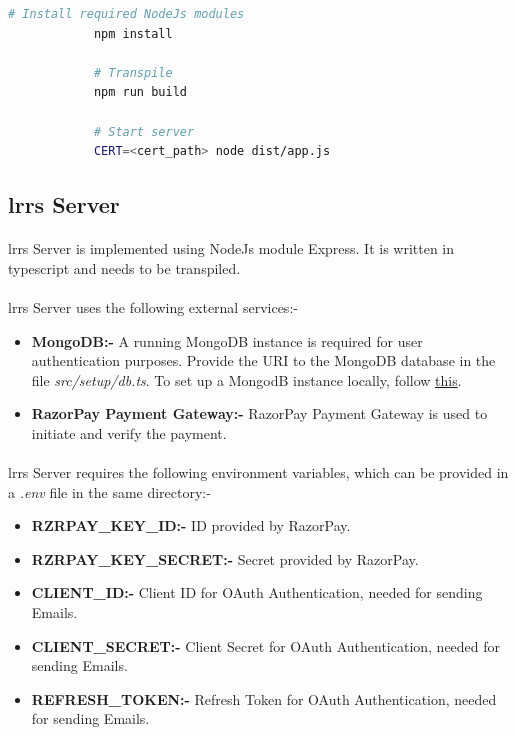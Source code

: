 \documentclass[12pt]{article}
\begin{document}
        \begin{lstlisting}[language=bash, caption=Verification Server]
            # Install required NodeJs modules
            npm install
        
            # Transpile
            npm run build
        
            # Start server
            CERT=<cert_path> node dist/app.js
            \end{lstlisting}
    
    \subsection{\acrshort{lrrs} Server}
        \paragraph{}
        \acrshort{lrrs} Server is implemented using NodeJs module Express. It is written in typescript and needs to be transpiled.
    
        \paragraph{}
        \acrshort{lrrs} Server uses the following external services:-
        \begin{itemize}
            \item \textbf{MongoDB:-} A running MongoDB instance is required for user authentication purposes. Provide the URI to the MongoDB database in the file \textit{src/setup/db.ts}. To set up a MongodB instance locally, follow \href{https://docs.mongodb.com/manual/installation/}{this}.
            \item \textbf{RazorPay Payment Gateway:-} RazorPay Payment Gateway is used to initiate and verify the payment.
        \end{itemize}
    
        \paragraph{}
        \acrshort{lrrs} Server requires the following environment variables, which can be provided in a \textit{.env} file in the same directory:-
        \begin{itemize}
            \item \textbf{RZRPAY\_KEY\_ID:-} ID provided by RazorPay.
            \item \textbf{RZRPAY\_KEY\_SECRET:-} Secret provided by RazorPay.
            \item \textbf{CLIENT\_ID:-} Client ID for OAuth Authentication, needed for sending Emails.
            \item \textbf{CLIENT\_SECRET:-} Client Secret for OAuth Authentication, needed for sending Emails.
            \item \textbf{REFRESH\_TOKEN:-} Refresh Token for OAuth Authentication, needed for sending Emails.
        \end{itemize}
        
\end{document}
